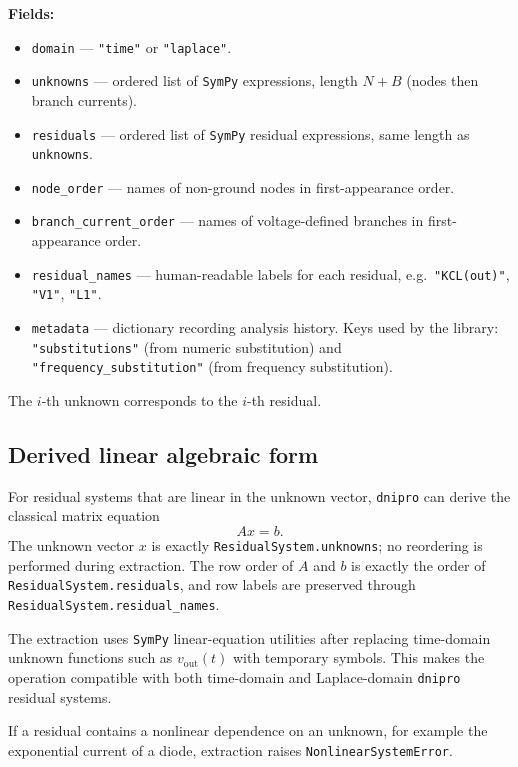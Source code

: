 \documentclass[11pt,a4paper]{article}
\newcommand{\project}{\texttt{dnipro}}
\newcommand{\code}[1]{\texttt{#1}}
\newcommand{\sympy}{\texttt{SymPy}}
\begin{document}
\textbf{Fields:}
\begin{itemize}[noitemsep]
    \item \code{domain} --- \code{"time"} or \code{"laplace"}.
    \item \code{unknowns} --- ordered list of \sympy{} expressions,
          length \(N + B\) (nodes then branch currents).
    \item \code{residuals} --- ordered list of \sympy{} residual expressions,
          same length as \code{unknowns}.
    \item \code{node\_order} --- names of non-ground nodes in first-appearance order.
    \item \code{branch\_current\_order} --- names of voltage-defined branches
          in first-appearance order.
    \item \code{residual\_names} --- human-readable labels for each residual,
          e.g.\ \code{"KCL(out)"}, \code{"V1"}, \code{"L1"}.
    \item \code{metadata} --- dictionary recording analysis history.
          Keys used by the library: \code{"substitutions"} (from numeric substitution)
          and \code{"frequency\_substitution"} (from frequency substitution).
\end{itemize}

The \(i\)-th unknown corresponds to the \(i\)-th residual.

\subsection{Derived linear algebraic form}

For residual systems that are linear in the unknown vector, \project{} can derive
the classical matrix equation
\begin{equation}
    A x = b.
\end{equation}
The unknown vector \(x\) is exactly \code{ResidualSystem.unknowns}; no reordering
is performed during extraction. The row order of \(A\) and \(b\) is exactly the
order of \code{ResidualSystem.residuals}, and row labels are preserved through
\code{ResidualSystem.residual\_names}.

The extraction uses \sympy{} linear-equation utilities after replacing
time-domain unknown functions such as \(v_{\mathrm{out}}(t)\) with temporary
symbols. This makes the operation compatible with both time-domain and
Laplace-domain \project{} residual systems.

If a residual contains a nonlinear dependence on an unknown, for example the
exponential current of a diode, extraction raises \code{NonlinearSystemError}.
\end{document}
